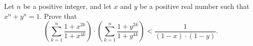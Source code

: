 Let $ n$ be a positive integer, and let $ x$ and $ y$ be a positive real number such that $ x^n + y^n = 1.$ Prove that\[ \left(\sum^n_{k = 1} \frac {1 + x^{2k}}{1 + x^{4k}} \right) \cdot \left( \sum^n_{k = 1} \frac {1 + y^{2k}}{1 + y^{4k}} \right) < \frac {1}{(1 - x) \cdot (1 - y)}.
\]
